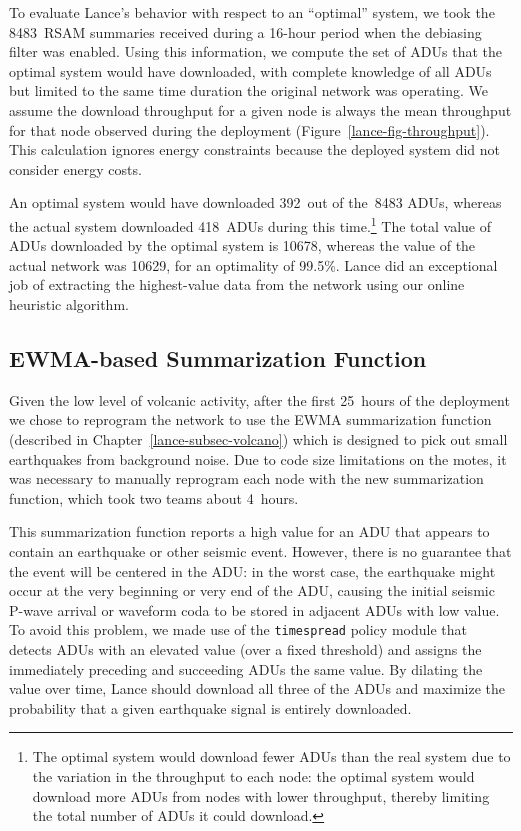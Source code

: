 To evaluate Lance's behavior with respect to an ``optimal'' system, we took
the 8483~RSAM summaries received during a 16-hour period when the debiasing
filter was enabled. Using this information, we compute the set of ADUs that
the optimal system would have downloaded, with complete knowledge of all ADUs
but limited to the same time duration the original network was operating. We
assume the download throughput for a given node is always the mean throughput
for that node observed during the deployment
(Figure~\ref{lance-fig-throughput}). This calculation ignores energy
constraints because the deployed system did not consider energy costs.

An optimal system would have downloaded 392~out of the~8483 ADUs, whereas the
actual system downloaded 418~ADUs during this time.\footnote{The optimal
system would download fewer ADUs than the real system due to the variation in
the throughput to each node: the optimal system would download more ADUs from
nodes with lower throughput, thereby limiting the total number of ADUs it
could download.} The total value of ADUs downloaded by the optimal system is
10678, whereas the value of the actual network was 10629, for an optimality
of 99.5\%. Lance did an exceptional job of extracting the highest-value data
from the network using our online heuristic algorithm.

\subsection{EWMA-based Summarization Function}
\label{lance-sec-ewma-deployment}

Given the low level of volcanic activity, after the first 25~hours of the
deployment we chose to reprogram the network to use the EWMA summarization
function (described in Chapter~\ref{lance-subsec-volcano}) which is designed
to pick out small earthquakes from background noise. Due to code size
limitations on the motes, it was necessary to manually reprogram each node
with the new summarization function, which took two teams about 4~hours.

This summarization function reports a high value for an ADU that appears to
contain an earthquake or other seismic event. However, there is no guarantee
that the event will be centered in the ADU: in the worst case, the earthquake
might occur at the very beginning or very end of the ADU, causing the initial
seismic P-wave arrival or waveform coda to be stored in adjacent ADUs with
low value. To avoid this problem, we made use of the \texttt{timespread}
policy module that detects ADUs with an elevated value (over a fixed
threshold) and assigns the immediately preceding and succeeding ADUs the same
value. By dilating the value over time, Lance should download all three of
the ADUs and maximize the probability that a given earthquake signal is
entirely downloaded.

